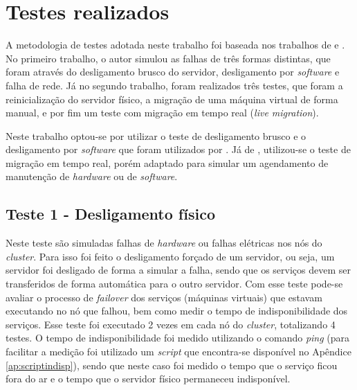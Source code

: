 \newpage
\section{Testes realizados}

A metodologia de testes adotada neste trabalho foi baseada nos trabalhos de \citet{reis2009} e \citet{goncalves2009}. No primeiro trabalho, 
o autor simulou as falhas de três formas distintas, que foram através do desligamento brusco do servidor, desligamento por \textit{software} e 
falha de rede. Já no segundo trabalho, foram realizados três testes, que foram a reinicialização do servidor físico, a migração de uma 
máquina virtual de forma manual, e por fim um teste com migração em tempo real (\textit{live migration}).

Neste trabalho optou-se por utilizar o teste de desligamento brusco e o desligamento por \textit{software} que foram utilizados por 
\citet{reis2009}. Já de \citet{goncalves2009}, utilizou-se o teste de migração em tempo real, porém adaptado para simular um agendamento de 
manutenção de \textit{hardware} ou de \textit{software}.


\subsection{Teste 1 - Desligamento físico}

Neste teste são simuladas falhas de \textit{hardware} ou falhas elétricas nos nós do \textit{cluster}. Para isso foi feito o desligamento 
forçado de um servidor, ou seja, um servidor foi desligado de forma a simular a falha, sendo que os serviços devem ser transferidos de forma
automática para o outro servidor. Com esse teste pode-se avaliar o processo de \textit{failover} dos serviços (máquinas virtuais) que estavam 
executando no nó que falhou, bem como medir o tempo de indisponibilidade dos serviços. Esse teste foi executado 2 vezes em cada nó do 
\textit{cluster}, totalizando 4 testes. O tempo de indisponibilidade foi medido utilizando o comando \textit{ping} (para facilitar a medição foi 
utilizado um \textit{script} que encontra-se disponível no Apêndice \ref{ap:scriptindisp}), sendo que neste caso foi medido o tempo que o 
serviço ficou fora do ar e o tempo que o servidor físico permaneceu indisponível.

